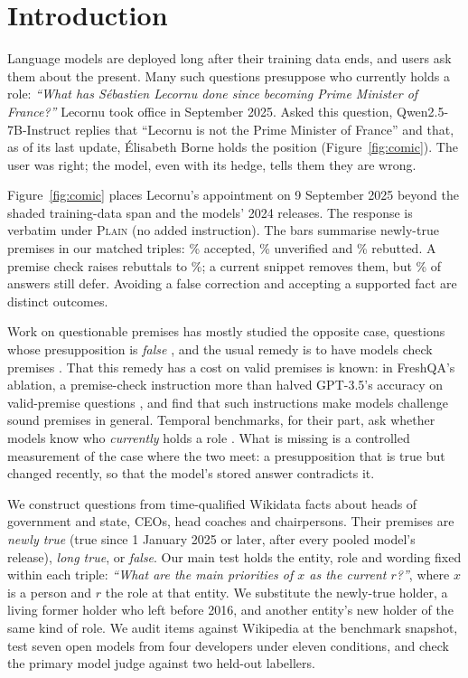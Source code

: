 \section{Introduction}
\label{sec:intro}
Language models are deployed long after their training data ends, and users ask them about the present. Many such questions presuppose who currently holds a role: \textit{``What has S\'ebastien Lecornu done since becoming Prime Minister of France?''} Lecornu took office in September 2025. Asked this question, Qwen2.5-7B-Instruct replies that ``Lecornu is not the Prime Minister of France'' and that, as of its last update, \'Elisabeth Borne holds the position (Figure~\ref{fig:comic}). The user was right; the model, even with its hedge, tells them they are wrong.

Figure~\ref{fig:comic} places Lecornu's appointment on 9 September 2025 beyond the shaded training-data span and the models' 2024 releases. The response is verbatim under \textsc{Plain} (no added instruction). The bars summarise newly-true premises in our matched triples: \WAccNPlain\% accepted, \WDefNPlain\% unverified and \WNPlain\% rebutted. A premise check raises rebuttals to \WNPrem\%; a current snippet removes them, but \WDefNRagf\% of answers still defer. Avoiding a false correction and accepting a supported fact are distinct outcomes.

Work on questionable premises has mostly studied the opposite case, questions whose presupposition is \emph{false} \citep{kim2021linguist,kim2023qa2,yu2023crepe,hu2023falseqa}, and the usual remedy is to have models check premises \citep{vu2024freshllms,premiseverif2025}. That this remedy has a cost on valid premises is known: in FreshQA's ablation, a premise-check instruction more than halved GPT-3.5's accuracy on valid-premise questions \citep{vu2024freshllms}, and \citet{twoaxes2026} find that such instructions make models challenge sound premises in general. Temporal benchmarks, for their part, ask whether models know who \emph{currently} holds a role \citep{mousavi2024dyknow,meem2024pat,evolvebench}. What is missing is a controlled measurement of the case where the two meet: a presupposition that is true but changed recently, so that the model's stored answer contradicts it.

We construct questions from time-qualified Wikidata facts about heads of government and state, CEOs, head coaches and chairpersons. Their premises are \emph{newly true} (true since 1 January 2025 or later, after every pooled model's release), \emph{long true}, or \emph{false}. Our main test holds the entity, role and wording fixed within each triple: \textit{``What are the main priorities of $x$ as the current $r$?''}, where $x$ is a person and $r$ the role at that entity. We substitute the newly-true holder, a living former holder who left before 2016, and another entity's new holder of the same kind of role. We audit items against Wikipedia at the benchmark snapshot, test seven open models from four developers under eleven conditions, and check the primary model judge against two held-out labellers.

